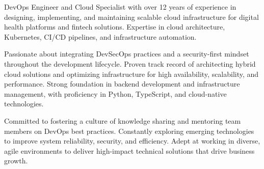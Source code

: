 
\begin{cvparagraph}

DevOps Engineer and Cloud Specialist with over 12 years of experience in designing, implementing, and maintaining scalable cloud infrastructure for digital health platforms and fintech solutions. Expertise in cloud architecture, Kubernetes, CI/CD pipelines, and infrastructure automation.

Passionate about integrating DevSecOps practices and a security-first mindset throughout the development lifecycle. Proven track record of architecting hybrid cloud solutions and optimizing infrastructure for high availability, scalability, and performance. Strong foundation in backend development and infrastructure management, with proficiency in Python, TypeScript, and cloud-native technologies.

Committed to fostering a culture of knowledge sharing and mentoring team members on DevOps best practices. Constantly exploring emerging technologies to improve system reliability, security, and efficiency. Adept at working in diverse, agile environments to deliver high-impact technical solutions that drive business growth.

\end{cvparagraph}
